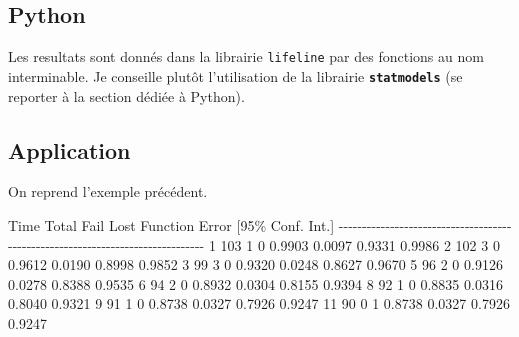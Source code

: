 \documentclass[
  12pt,
  letterpaper,
  DIV=11,
  numbers=noendperiod,
  onepage,
  openany]{scrreprt}
\newenvironment{Shaded}{\begin{snugshade}}{\end{snugshade}}
\newcommand{\DecValTok}[1]{\textcolor[rgb]{0.86,0.86,0.80}{#1}}
\newcommand{\FloatTok}[1]{\textcolor[rgb]{0.75,0.75,0.82}{#1}}
\newcommand{\NormalTok}[1]{\textcolor[rgb]{0.80,0.80,0.80}{#1}}
\newcommand{\SpecialCharTok}[1]{\textcolor[rgb]{0.86,0.64,0.64}{#1}}
\begin{document}
\subsection{Python}

Les resultats sont donnés dans la librairie \texttt{lifeline} par des
fonctions au nom interminable. Je conseille plutôt l'utilisation de la
librairie \textbf{\texttt{statmodels}} (se reporter à la section dédiée
à Python).

\hypertarget{application-1}{%
\subsection{Application}\label{application-1}}

On reprend l'exemple précédent.

\begin{Shaded}
\begin{Highlighting}[]
\NormalTok{Time    Total   Fail   Lost           Function     Error     [}\DecValTok{95}\NormalTok{\% Conf. Int.]}
\SpecialCharTok{{-}{-}{-}{-}{-}{-}{-}{-}{-}{-}{-}{-}{-}{-}{-}{-}{-}{-}{-}{-}{-}{-}{-}{-}{-}{-}{-}{-}{-}{-}{-}{-}{-}{-}{-}{-}{-}{-}{-}{-}{-}{-}{-}{-}{-}{-}{-}{-}{-}{-}{-}{-}{-}{-}{-}{-}{-}{-}{-}{-}{-}{-}{-}{-}{-}{-}{-}{-}{-}{-}{-}{-}{-}{-}{-}{-}{-}{-}{-}}
     \DecValTok{1}      \DecValTok{103}      \DecValTok{1}      \DecValTok{0}             \FloatTok{0.9903}    \FloatTok{0.0097}     \FloatTok{0.9331}    \FloatTok{0.9986}
     \DecValTok{2}      \DecValTok{102}      \DecValTok{3}      \DecValTok{0}             \FloatTok{0.9612}    \FloatTok{0.0190}     \FloatTok{0.8998}    \FloatTok{0.9852}
     \DecValTok{3}       \DecValTok{99}      \DecValTok{3}      \DecValTok{0}             \FloatTok{0.9320}    \FloatTok{0.0248}     \FloatTok{0.8627}    \FloatTok{0.9670}
     \DecValTok{5}       \DecValTok{96}      \DecValTok{2}      \DecValTok{0}             \FloatTok{0.9126}    \FloatTok{0.0278}     \FloatTok{0.8388}    \FloatTok{0.9535}
     \DecValTok{6}       \DecValTok{94}      \DecValTok{2}      \DecValTok{0}             \FloatTok{0.8932}    \FloatTok{0.0304}     \FloatTok{0.8155}    \FloatTok{0.9394}
     \DecValTok{8}       \DecValTok{92}      \DecValTok{1}      \DecValTok{0}             \FloatTok{0.8835}    \FloatTok{0.0316}     \FloatTok{0.8040}    \FloatTok{0.9321}
     \DecValTok{9}       \DecValTok{91}      \DecValTok{1}      \DecValTok{0}             \FloatTok{0.8738}    \FloatTok{0.0327}     \FloatTok{0.7926}    \FloatTok{0.9247}
    \DecValTok{11}       \DecValTok{90}      \DecValTok{0}      \DecValTok{1}             \FloatTok{0.8738}    \FloatTok{0.0327}     \FloatTok{0.7926}    \FloatTok{0.9247}

\end{Highlighting}
\end{Shaded}
\end{document}
